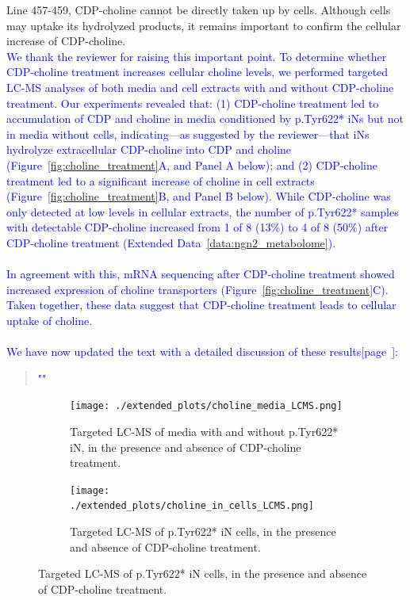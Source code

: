 \documentclass[12pt]{article}
\begin{document}
Line 457-459, CDP-choline cannot be directly taken up by cells. Although cells may uptake its hydrolyzed products, it remains important to confirm the cellular increase of CDP-choline.\\
\textcolor{blue}{We thank the reviewer for raising this important point. To determine whether CDP-choline treatment increases cellular choline levels, we performed targeted LC-MS analyses of both media and cell extracts with and without CDP-choline treatment. Our experiments revealed that: (1) CDP-choline treatment led to accumulation of CDP and choline in media conditioned by p.Tyr622* iNs but not in media without cells, indicating—as suggested by the reviewer—that iNs hydrolyze extracellular CDP-choline into CDP and choline (Figure~\ref{fig:choline_treatment}A, and Panel A below); and (2) CDP-choline treatment led to a  significant increase of choline in cell extracts (Figure~\ref{fig:choline_treatment}B, and Panel B below). While CDP-choline was only detected at low levels in cellular extracts, the number of  p.Tyr622* samples with detectable CDP-choline increased from 1 of 8 (13\%) to 4 of 8 (50\%) after CDP-choline treatment (Extended Data~\ref{data:ngn2_metabolome}).}\\\\
\textcolor{blue}{In agreement with this, mRNA sequencing after CDP-choline treatment showed increased expression of choline transporters (Figure~\ref{fig:choline_treatment}C). Taken together, these data suggest that CDP-choline treatment leads to cellular uptake of choline.}\\\\
\textcolor{blue}{We have now updated the text with a detailed discussion of these results[page~\pageref{quoteD-label}]:}
\begin{quote}
	\textcolor{blue}{"\quoteD"}
\end{quote}

\begin{figure}[H] 
	\begin{subfigure}[t]{\textwidth}
		\caption{Targeted LC-MS of media with and without p.Tyr622* iN, in the presence and absence of CDP-choline treatment.}
		\texttt{[image: ./extended\_plots/choline\_media\_LCMS.png]}        
	\end{subfigure}
	\centering
	\begin{subfigure}[t]{.4\textwidth}
		\caption{Targeted LC-MS of p.Tyr622* iN cells, in the presence and absence of CDP-choline treatment.}
		\texttt{[image: ./extended\_plots/choline\_in\_cells\_LCMS.png]}        
	\end{subfigure}
\end{figure}
\end{document}
